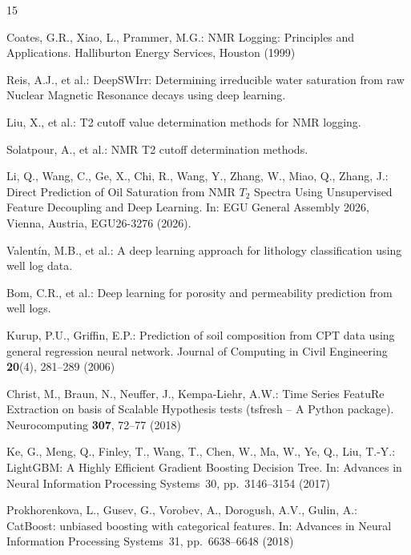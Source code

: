 \documentclass[runningheads]{llncs}
\begin{document}
%

%
\begin{thebibliography}{15}

Coates, G.R., Xiao, L., Prammer, M.G.:
NMR Logging: Principles and Applications.
Halliburton Energy Services, Houston (1999)

Reis, A.J., et al.:
DeepSWIrr: Determining irreducible water saturation from raw Nuclear Magnetic Resonance
decays using deep learning.

Liu, X., et al.:
T2 cutoff value determination methods for NMR logging.

Solatpour, A., et al.:
NMR T2 cutoff determination methods.

Li, Q., Wang, C., Ge, X., Chi, R., Wang, Y., Zhang, W., Miao, Q., Zhang, J.:
Direct Prediction of Oil Saturation from NMR $T_2$ Spectra Using Unsupervised Feature
Decoupling and Deep Learning.
In: EGU General Assembly 2026, Vienna, Austria, EGU26-3276 (2026).

Valent\'{i}n, M.B., et al.:
A deep learning approach for lithology classification using well log data.

Bom, C.R., et al.:
Deep learning for porosity and permeability prediction from well logs.

Kurup, P.U., Griffin, E.P.:
Prediction of soil composition from CPT data using general regression neural network.
Journal of Computing in Civil Engineering \textbf{20}(4), 281--289 (2006)

Christ, M., Braun, N., Neuffer, J., Kempa-Liehr, A.W.:
Time Series FeatuRe Extraction on basis of Scalable Hypothesis tests (tsfresh -- A Python package).
Neurocomputing \textbf{307}, 72--77 (2018)

Ke, G., Meng, Q., Finley, T., Wang, T., Chen, W., Ma, W., Ye, Q., Liu, T.-Y.:
LightGBM: A Highly Efficient Gradient Boosting Decision Tree.
In: Advances in Neural Information Processing Systems~30, pp.~3146--3154 (2017)

Prokhorenkova, L., Gusev, G., Vorobev, A., Dorogush, A.V., Gulin, A.:
CatBoost: unbiased boosting with categorical features.
In: Advances in Neural Information Processing Systems~31, pp.~6638--6648 (2018)


\end{thebibliography}
\end{document}

